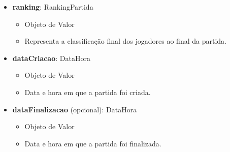 \begin{itemize}
        \item \textbf{ranking}: RankingPartida  
            \begin{itemize}
                \item Objeto de Valor
                \item Representa a classificação final dos jogadores ao final da partida.
            \end{itemize}

        \item \textbf{dataCriacao}: DataHora  
            \begin{itemize}
                \item Objeto de Valor
                \item Data e hora em que a partida foi criada.
            \end{itemize}

        \item \textbf{dataFinalizacao} (opcional): DataHora  
            \begin{itemize}
                \item Objeto de Valor
                \item Data e hora em que a partida foi finalizada.
            \end{itemize}
    \end{itemize}

